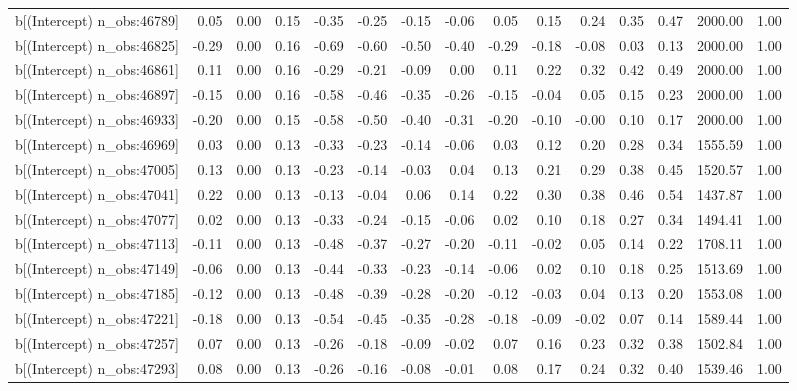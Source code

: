 \begin{table}[ht]
\begin{tabular}{rrrrrrrrrrrrrrr}
  b[(Intercept) n\_obs:46789] & 0.05 & 0.00 & 0.15 & -0.35 & -0.25 & -0.15 & -0.06 & 0.05 & 0.15 & 0.24 & 0.35 & 0.47 & 2000.00 & 1.00 \\ 
  b[(Intercept) n\_obs:46825] & -0.29 & 0.00 & 0.16 & -0.69 & -0.60 & -0.50 & -0.40 & -0.29 & -0.18 & -0.08 & 0.03 & 0.13 & 2000.00 & 1.00 \\ 
  b[(Intercept) n\_obs:46861] & 0.11 & 0.00 & 0.16 & -0.29 & -0.21 & -0.09 & 0.00 & 0.11 & 0.22 & 0.32 & 0.42 & 0.49 & 2000.00 & 1.00 \\ 
  b[(Intercept) n\_obs:46897] & -0.15 & 0.00 & 0.16 & -0.58 & -0.46 & -0.35 & -0.26 & -0.15 & -0.04 & 0.05 & 0.15 & 0.23 & 2000.00 & 1.00 \\ 
  b[(Intercept) n\_obs:46933] & -0.20 & 0.00 & 0.15 & -0.58 & -0.50 & -0.40 & -0.31 & -0.20 & -0.10 & -0.00 & 0.10 & 0.17 & 2000.00 & 1.00 \\ 
  b[(Intercept) n\_obs:46969] & 0.03 & 0.00 & 0.13 & -0.33 & -0.23 & -0.14 & -0.06 & 0.03 & 0.12 & 0.20 & 0.28 & 0.34 & 1555.59 & 1.00 \\ 
  b[(Intercept) n\_obs:47005] & 0.13 & 0.00 & 0.13 & -0.23 & -0.14 & -0.03 & 0.04 & 0.13 & 0.21 & 0.29 & 0.38 & 0.45 & 1520.57 & 1.00 \\ 
  b[(Intercept) n\_obs:47041] & 0.22 & 0.00 & 0.13 & -0.13 & -0.04 & 0.06 & 0.14 & 0.22 & 0.30 & 0.38 & 0.46 & 0.54 & 1437.87 & 1.00 \\ 
  b[(Intercept) n\_obs:47077] & 0.02 & 0.00 & 0.13 & -0.33 & -0.24 & -0.15 & -0.06 & 0.02 & 0.10 & 0.18 & 0.27 & 0.34 & 1494.41 & 1.00 \\ 
  b[(Intercept) n\_obs:47113] & -0.11 & 0.00 & 0.13 & -0.48 & -0.37 & -0.27 & -0.20 & -0.11 & -0.02 & 0.05 & 0.14 & 0.22 & 1708.11 & 1.00 \\ 
  b[(Intercept) n\_obs:47149] & -0.06 & 0.00 & 0.13 & -0.44 & -0.33 & -0.23 & -0.14 & -0.06 & 0.02 & 0.10 & 0.18 & 0.25 & 1513.69 & 1.00 \\ 
  b[(Intercept) n\_obs:47185] & -0.12 & 0.00 & 0.13 & -0.48 & -0.39 & -0.28 & -0.20 & -0.12 & -0.03 & 0.04 & 0.13 & 0.20 & 1553.08 & 1.00 \\ 
  b[(Intercept) n\_obs:47221] & -0.18 & 0.00 & 0.13 & -0.54 & -0.45 & -0.35 & -0.28 & -0.18 & -0.09 & -0.02 & 0.07 & 0.14 & 1589.44 & 1.00 \\ 
  b[(Intercept) n\_obs:47257] & 0.07 & 0.00 & 0.13 & -0.26 & -0.18 & -0.09 & -0.02 & 0.07 & 0.16 & 0.23 & 0.32 & 0.38 & 1502.84 & 1.00 \\ 
  b[(Intercept) n\_obs:47293] & 0.08 & 0.00 & 0.13 & -0.26 & -0.16 & -0.08 & -0.01 & 0.08 & 0.17 & 0.24 & 0.32 & 0.40 & 1539.46 & 1.00 \\ 

\end{tabular}
\end{table}
